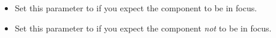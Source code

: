 
\begin{itemize}
\item Set this parameter to \gdrefbooleantrue{} if you expect the component to be in focus.
\item Set this parameter to \gdrefbooleanfalse{} if you expect the component \emph{not} to be in focus.
\end{itemize}
